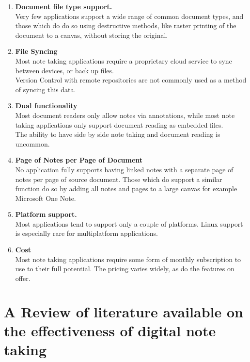     
	\begin{enumerate}
	    \item \textbf{Document file type support.} \\
        Very few applications support a wide range of common document types, and those which do do so using destructive methods, like raster printing of the document to a canvas, without storing the original. 
        
	    \item \textbf{File Syncing} \\
        Most note taking applications require a proprietary cloud service to sync between devices, or back up files. \\
        Version Control with remote repositories are not commonly used as a method of syncing this data.
    
	    \item \textbf{Dual functionality } \\
        Most document readers only allow notes via annotations, while most note taking applications only support document reading as embedded files. \\ 
        The ability to have side by side note taking and document reading is uncommon.
        
	    \item \textbf{Page of Notes per Page of Document} \\
        No application fully supports having linked notes with a separate page of notes per page of source document. Those which do support a similar function do so by adding all notes and pages to a large canvas for example Microsoft One Note. 
        
	    \item \textbf{Platform support.} \\
        Most applications tend to support only a couple of platforms. Linux support is especially rare for multiplatform applications.  
        
	    \item \textbf{Cost} \\
        Most note taking applications require some form of monthly subscription to use to their full potential. The pricing varies widely, as do the features on offer.
        
	\end{enumerate}

 \section{A Review of literature available on the effectiveness of digital note taking}

